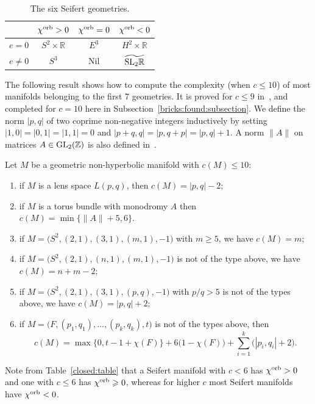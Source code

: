 \documentclass[10pt]{article}      %
\newcommand{\matR} {\ensuremath {\mathbb{R}}}
\newcommand{\matZ} {\ensuremath {\mathbb{Z}}}
\begin{document}
\begin{table}
\begin{center}
\begin{tabular}{c|ccc} 
\phantom{\Big|} & $\chi^{\rm orb}>0$ & $\chi^{\rm orb}=0$ & $\chi^{\rm orb}<0$ \\ \hline
\phantom{\Big|} $e=0$ & $S^2\times\matR$ & $E^3$ & $H^2\times\matR$ \\
\phantom{\Big|} $e\neq 0$ & $S^3$ & Nil & $\widetilde{{\rm SL}_2\matR}$ \\ 
\end{tabular}
\end{center}
\caption{The six Seifert geometries.}
\label{tabellina}
\end{table} 

The following result shows how to compute the complexity (when $c\leqslant 10$)
of most manifolds belonging to the first 7 geometries. It is proved for $c\leqslant 9$
in~\cite{MaPe:geometric}, and completed for $c=10$ here in Subsection~\ref{bricks:found:subsection}.
We define the norm $|p,q|$ of two coprime non-negative integers inductively by setting
$|1,0|=|0,1|=|1,1|=0$ and $|p+q,q|=|p,q+p|=|p,q|+1$.
A norm $\|A\|$ on matrices $A\in\GL_2(\matZ)$ is
also defined in~\cite{MaPe:geometric}.

\begin{theorem}\label{non:hyperbolic:teo}
Let $M$ be a geometric non-hyperbolic manifold with $c(M)\leqslant 10$:
\begin{enumerate}
\item if $M$ is a lens space $L(p,q)$, then $c(M)=|p,q|-2$;
\item if $M$ is a torus bundle with monodromy $A$
then $c(M)=\min\{\|A\|+5, 6\}.$
\item \label{23m} if $M=\big(S^2,(2,1),(3,1),(m,1),-1\big)$ with $m\geqslant 5$, we have $c(M)=m$;
\item \label{2nm} if $M=\big(S^2,(2,1),(n,1),(m,1),-1\big)$ is not of the type above, 
  we have $c(M)=n+m-2$;
\item \label{23pq} if $M=\big(S^2,(2,1),(3,1),(p,q),-1\big)$ with $p/q>5$ is not of the types above, 
  we have $c(M)=|p,q|+2$;
\item if $M=\big(F, (p_1, q_1),\ldots, (p_k, q_k), t\big)$ is not of the types above, then
$$c(M)=\max\big\{0,t-1+\chi(F)\big\}+6\big(1-\chi(F)\big) +
  \sum_{i=1}^k\big(|p_i,q_i|+2\big). $$
\end{enumerate}
\end{theorem}

Note from Table~\ref{closed:table} that a Seifert manifold with $c<6$ has $\chi^{\rm orb}>0$ and
one with $c\leqslant 6$ has $\chi^{\rm orb}\geqslant 0$, 
whereas for higher $c$ most Seifert manifolds have $\chi^{\rm orb}<0$.
\end{document}
